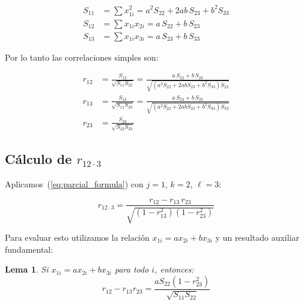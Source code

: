 \documentclass[12pt, letterpaper]{article}
\newtheorem{lema}{Lema}
\theoremstyle{remark}
\newcommand{\rp}[2]{r_{#1 \cdot #2}}   %
\begin{document}
\begin{align}
  S_{11} &= \sum x_{1i}^2
           = a^2 S_{22} + 2ab\, S_{23} + b^2 S_{33}
  \label{eq:S11}\\
  S_{12} &= \sum x_{1i} x_{2i}
           = a\,S_{22} + b\,S_{23}
  \label{eq:S12}\\
  S_{13} &= \sum x_{1i} x_{3i}
           = a\,S_{23} + b\,S_{33}
  \label{eq:S13}
\end{align}

Por lo tanto las correlaciones simples son:

\begin{align}
  r_{12} &= \frac{S_{12}}{\sqrt{S_{11}S_{22}}}
           = \frac{a\,S_{22} + b\,S_{23}}{\sqrt{(a^2 S_{22}+2ab S_{23}+b^2 S_{33})S_{22}}}
  \label{eq:r12_expr}\\[6pt]
  r_{13} &= \frac{S_{13}}{\sqrt{S_{11}S_{33}}}
           = \frac{a\,S_{23} + b\,S_{33}}{\sqrt{(a^2 S_{22}+2ab S_{23}+b^2 S_{33})S_{33}}}
  \label{eq:r13_expr}\\[6pt]
  r_{23} &= \frac{S_{23}}{\sqrt{S_{22}S_{33}}}
  \label{eq:r23}
\end{align}

\subsection{Cálculo de \texorpdfstring{$\rp{12}{3}$}{r12.3}}

Aplicamos~(\ref{eq:parcial_formula}) con $j=1$, $k=2$, $\ell=3$:

\begin{equation}
  \rp{12}{3}
    = \frac{r_{12} - r_{13}\,r_{23}}
           {\sqrt{(1-r_{13}^2)(1-r_{23}^2)}}
  \label{eq:r12_3_formula}
\end{equation}

Para evaluar esto utilizamos la relación $x_{1i} = a x_{2i} + b x_{3i}$ y un
resultado auxiliar fundamental:

\begin{lema}
  \label{lema1}
  Si $x_{1i} = a x_{2i} + b x_{3i}$ para todo $i$, entonces:
  \begin{equation}
    r_{12} - r_{13} r_{23}
      = \frac{a S_{22}(1 - r_{23}^2)}
             {\sqrt{S_{11} S_{22}}}
    \label{eq:numerador}
  \end{equation}
\end{lema}
\end{document}
